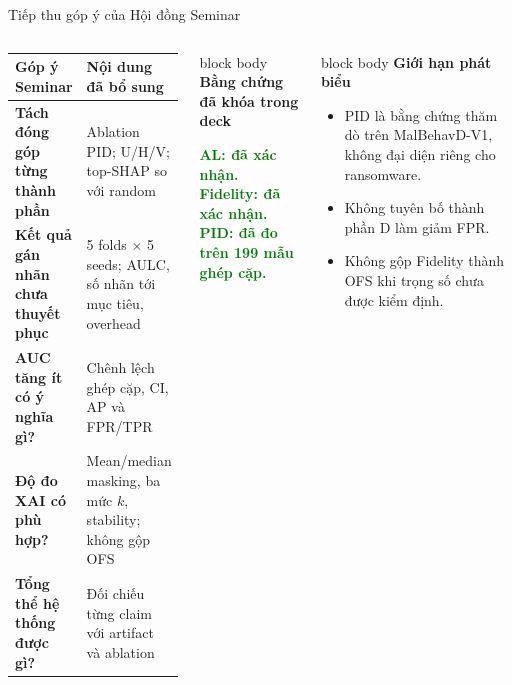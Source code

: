 \documentclass[aspectratio=169,10pt]{beamer}
\newcommand{\good}[1]{\textcolor{green}{\textbf{#1}}}
\newcommand{\smallbullet}{\setlength{\itemsep}{0.15em}\setlength{\parskip}{0pt}}
\newenvironment{bluebox}[1]{%
  \begin{beamercolorbox}[rounded=true,shadow=true,sep=0.18cm]{block body}%
  {\color{uetblue}\textbf{#1}}\par\vspace{0.08cm}\color{ink}%
}{\end{beamercolorbox}}
\begin{document}
\begin{frame}[t,shrink=8]{Tiếp thu góp ý của Hội đồng Seminar}
\begin{columns}[T,onlytextwidth]
\scriptsize
\renewcommand{\arraystretch}{1.28}
\begin{tabularx}{\linewidth}{>{\bfseries}p{2.45cm} X}
\toprule
Góp ý Seminar & Nội dung đã bổ sung \\
\midrule
Tách đóng góp từng thành phần & Ablation PID; U/H/V; top-SHAP so với random \\
Kết quả gán nhãn chưa thuyết phục & 5 folds $\times$ 5 seeds; AULC, số nhãn tới mục tiêu, overhead \\
AUC tăng ít có ý nghĩa gì? & Chênh lệch ghép cặp, CI, AP và FPR/TPR \\
Độ đo XAI có phù hợp? & Mean/median masking, ba mức $k$, stability; không gộp OFS \\
Tổng thể hệ thống được gì? & Đối chiếu từng claim với artifact và ablation \\
\bottomrule
\end{tabularx}

\begin{bluebox}{Bằng chứng đã khóa trong deck}
\small
\good{AL: đã xác nhận.}\\[1mm]
\good{Fidelity: đã xác nhận.}\\[1mm]
\good{PID: đã đo trên 199 mẫu ghép cặp.}
\end{bluebox}

\vspace{0.16cm}
\begin{bluebox}{Giới hạn phát biểu}
\small
\begin{itemize}\smallbullet
  \item PID là bằng chứng thăm dò trên MalBehavD-V1, không đại diện riêng cho ransomware.
  \item Không tuyên bố thành phần D làm giảm FPR.
  \item Không gộp Fidelity thành OFS khi trọng số chưa được kiểm định.
\end{itemize}
\end{bluebox}
\end{columns}

\end{frame}
\end{document}
